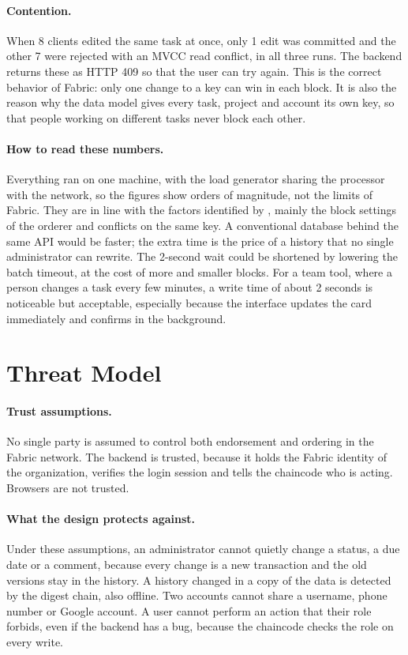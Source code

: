 \paragraph*{Contention.} When 8 clients edited the same task at once, only 1 edit was committed and the other 7 were rejected with an MVCC read conflict, in all three runs. The backend returns these as HTTP 409 so that the user can try again. This is the correct behavior of Fabric: only one change to a key can win in each block. It is also the reason why the data model gives every task, project and account its own key, so that people working on different tasks never block each other.

\paragraph*{How to read these numbers.} Everything ran on one machine, with the load generator sharing the processor with the network, so the figures show orders of magnitude, not the limits of Fabric. They are in line with the factors identified by \textcite{thakkar2018performance}, mainly the block settings of the orderer and conflicts on the same key. A conventional database behind the same API would be faster; the extra time is the price of a history that no single administrator can rewrite. The 2-second wait could be shortened by lowering the batch timeout, at the cost of more and smaller blocks. For a team tool, where a person changes a task every few minutes, a write time of about 2 seconds is noticeable but acceptable, especially because the interface updates the card immediately and confirms in the background.

\section{Threat Model}
\label{sec:results-threats}

\paragraph*{Trust assumptions.} No single party is assumed to control both endorsement and ordering in the Fabric network. The backend is trusted, because it holds the Fabric identity of the organization, verifies the login session and tells the chaincode who is acting. Browsers are not trusted.

\paragraph*{What the design protects against.} Under these assumptions, an administrator cannot quietly change a status, a due date or a comment, because every change is a new transaction and the old versions stay in the history. A history changed in a copy of the data is detected by the digest chain, also offline. Two accounts cannot share a username, phone number or Google account. A user cannot perform an action that their role forbids, even if the backend has a bug, because the chaincode checks the role on every write.

